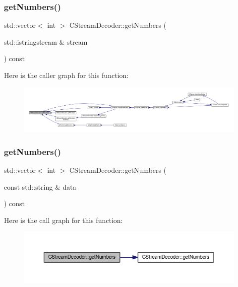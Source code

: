 \subsubsection{\texorpdfstring{get\+Numbers()}{getNumbers()}\hspace{0.1cm}{\footnotesize\ttfamily [1/2]}}
{\footnotesize\ttfamily std\+::vector$<$ int $>$ C\+Stream\+Decoder\+::get\+Numbers (\begin{DoxyParamCaption}\item[{std\+::istringstream \&}]{stream }\end{DoxyParamCaption}) const}

Here is the caller graph for this function\+:\nopagebreak
\begin{figure}[H]
\begin{center}
\leavevmode
\includegraphics[width=350pt]{class_c_stream_decoder_a57a7f304974a6b5be31e374685b70e33_icgraph}
\end{center}
\end{figure}
\mbox{\label{class_c_stream_decoder_a848bbd5eb77abad9007b94cf631b0761}} 
\subsubsection{\texorpdfstring{get\+Numbers()}{getNumbers()}\hspace{0.1cm}{\footnotesize\ttfamily [2/2]}}
{\footnotesize\ttfamily std\+::vector$<$ int $>$ C\+Stream\+Decoder\+::get\+Numbers (\begin{DoxyParamCaption}\item[{const std\+::string \&}]{data }\end{DoxyParamCaption}) const}

Here is the call graph for this function\+:\nopagebreak
\begin{figure}[H]
\begin{center}
\leavevmode
\includegraphics[width=350pt]{class_c_stream_decoder_a848bbd5eb77abad9007b94cf631b0761_cgraph}
\end{center}
\end{figure}
\mbox{\label{class_c_stream_decoder_a5df71ab29ca4dc60f6c628fcb4a77949}} 
